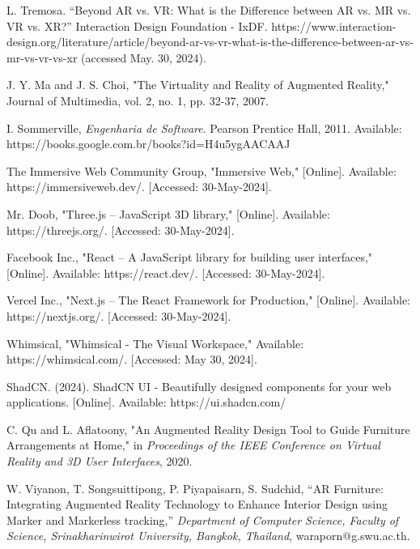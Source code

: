 \documentclass[conference]{IEEEtran}
\begin{document}
\begin{thebibliography}{00}
  L. Tremosa. “Beyond AR vs. VR: What is the Difference between AR vs. MR vs. VR vs. XR?” Interaction Design Foundation - IxDF. https://www.interaction-design.org/literature/article/beyond-ar-vs-vr-what-is-the-difference-between-ar-vs-mr-vs-vr-vs-xr (accessed May. 30, 2024).

  J. Y. Ma and J. S. Choi, "The Virtuality and Reality of Augmented Reality," Journal of Multimedia, vol. 2, no. 1, pp. 32-37, 2007.

  I. Sommerville, \emph{Engenharia de Software}. Pearson Prentice Hall, 2011. Available: https://books.google.com.br/books?id=H4u5ygAACAAJ

  The Immersive Web Community Group, "Immersive Web," [Online]. Available: https://immersiveweb.dev/. [Accessed: 30-May-2024].

  Mr. Doob, "Three.js – JavaScript 3D library," [Online]. Available: https://threejs.org/. [Accessed: 30-May-2024].

  Facebook Inc., "React – A JavaScript library for building user interfaces," [Online]. Available: https://react.dev/. [Accessed: 30-May-2024].

  Vercel Inc., "Next.js – The React Framework for Production," [Online]. Available: https://nextjs.org/. [Accessed: 30-May-2024].

  Whimsical, "Whimsical - The Visual Workspace," Available: https://whimsical.com/. [Accessed: May 30, 2024].

  ShadCN. (2024). ShadCN UI - Beautifully designed components for your web applications. [Online]. Available: https://ui.shadcn.com/

  C. Qu and L. Aflatoony, "An Augmented Reality Design Tool to Guide Furniture Arrangements at Home," in \textit{Proceedings of the IEEE Conference on Virtual Reality and 3D User Interfaces}, 2020.

  W. Viyanon, T. Songsuittipong, P. Piyapaisarn, S. Sudchid,
  ``AR Furniture: Integrating Augmented Reality Technology to Enhance Interior Design using Marker and Markerless tracking,''
  \emph{Department of Computer Science, Faculty of Science, Srinakharinwirot University, Bangkok, Thailand},
  waraporn@g.swu.ac.th.


\end{thebibliography}
\end{document}
